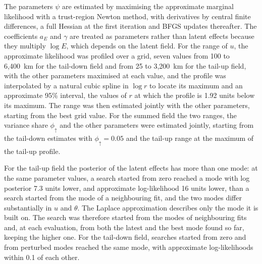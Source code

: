 \documentclass[11pt,a4paper]{article}
\begin{document}
The parameters $\psi$ are estimated by maximising the approximate marginal likelihood with a trust-region Newton method, with derivatives by central finite differences, a full Hessian at the first iteration and BFGS updates thereafter. The coefficients $a_E$ and $\gamma$ are treated as parameters rather than latent effects because they multiply $\log E$, which depends on the latent field. For the range of $u$, the approximate likelihood was profiled over a grid, seven values from 100 to 6{,}400~km for the tail-down field and from 25 to 3{,}200~km for the tail-up field, with the other parameters maximised at each value, and the profile was interpolated by a natural cubic spline in $\log r$ to locate its maximum and an approximate 95\% interval, the values of $r$ at which the profile is 1.92 units below its maximum. The range was then estimated jointly with the other parameters, starting from the best grid value. For the summed field the two ranges, the variance share $\phi_\uparrow$ and the other parameters were estimated jointly, starting from the tail-down estimates with $\phi_\uparrow = 0.05$ and the tail-up range at the maximum of the tail-up profile.

For the tail-up field the posterior of the latent effects has more than one mode: at the same parameter values, a search started from zero reached a mode with log posterior 7.3 units lower, and approximate log-likelihood 16 units lower, than a search started from the mode of a neighbouring fit, and the two modes differ substantially in $u$ and $\theta$. The Laplace approximation describes only the mode it is built on. The search was therefore started from the modes of neighbouring fits and, at each evaluation, from both the latest and the best mode found so far, keeping the higher one. For the tail-down field, searches started from zero and from perturbed modes reached the same mode, with approximate log-likelihoods within 0.1 of each other.
\end{document}
